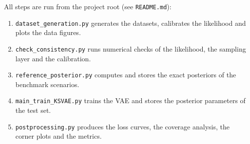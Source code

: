 \documentclass[11pt]{article}
\begin{document}
All steps are run from the project root (see \texttt{README.md}):
\begin{enumerate}[leftmargin=*]
\item \texttt{dataset\_generation.py} generates the datasets, calibrates the likelihood and plots the data figures.
\item \texttt{check\_consistency.py} runs numerical checks of the likelihood, the sampling layer and the calibration.
\item \texttt{reference\_posterior.py} computes and stores the exact posteriors of the benchmark scenarios.
\item \texttt{main\_train\_KSVAE.py} trains the VAE and stores the posterior parameters of the test set.
\item \texttt{postprocessing.py} produces the loss curves, the coverage analysis, the corner plots and the metrics.
\end{enumerate}
\end{document}
